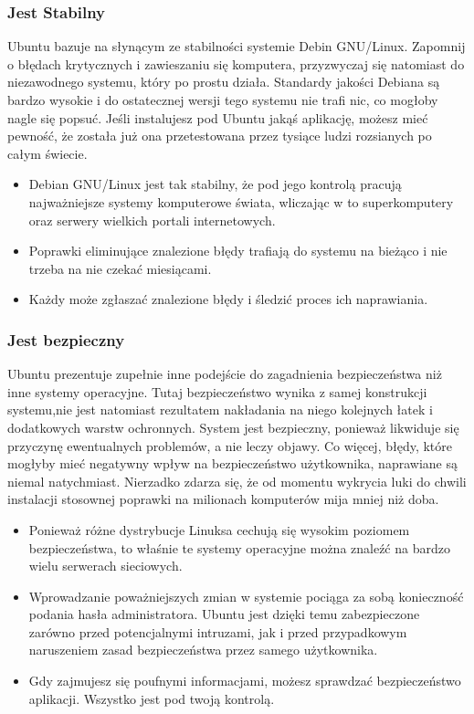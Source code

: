 \subsubsection{Jest Stabilny}
Ubuntu bazuje na słynącym ze stabilności systemie Debin GNU/Linux. Zapomnij o błędach krytycznych i zawieszaniu się komputera, przyzwyczaj się natomiast do niezawodnego systemu, który po prostu działa. Standardy jakości Debiana są bardzo wysokie i do ostatecznej wersji tego systemu nie trafi nic, co mogłoby nagle się popsuć. Jeśli instalujesz pod Ubuntu jakąś aplikację, możesz mieć pewność, że została już ona przetestowana przez tysiące ludzi rozsianych po całym świecie.
\begin{itemize}
\item Debian GNU/Linux jest tak stabilny, że pod jego kontrolą pracują najważniejsze systemy komputerowe świata, wliczając w to superkomputery oraz serwery wielkich portali internetowych.
\item Poprawki eliminujące znalezione błędy trafiają do systemu na bieżąco i nie trzeba na nie czekać miesiącami.
\item Każdy może zgłaszać znalezione błędy i śledzić proces ich naprawiania.
\end{itemize}

\subsubsection{Jest bezpieczny}
Ubuntu prezentuje zupełnie inne podejście do zagadnienia bezpieczeństwa niż inne systemy operacyjne. Tutaj bezpieczeństwo wynika z samej konstrukcji systemu,nie jest natomiast rezultatem nakładania na niego kolejnych łatek i dodatkowych warstw ochronnych. System jest bezpieczny, ponieważ likwiduje się przyczynę ewentualnych problemów, a nie leczy objawy. Co więcej, błędy, które mogłyby mieć negatywny wpływ na bezpieczeństwo użytkownika, naprawiane są niemal natychmiast. Nierzadko zdarza się, że od momentu wykrycia luki do chwili instalacji stosownej poprawki na milionach komputerów mija mniej niż doba.
\begin{itemize}
\item Ponieważ różne dystrybucje Linuksa cechują się wysokim poziomem bezpieczeństwa, to właśnie te systemy operacyjne można znaleźć na bardzo wielu serwerach sieciowych.
\item Wprowadzanie poważniejszych zmian w systemie pociąga za sobą konieczność podania hasła administratora. Ubuntu jest dzięki temu zabezpieczone zarówno przed potencjalnymi intruzami, jak i przed przypadkowym naruszeniem zasad bezpieczeństwa przez samego użytkownika.
\item Gdy zajmujesz się poufnymi informacjami, możesz sprawdzać bezpieczeństwo aplikacji. Wszystko jest pod twoją kontrolą.
\end{itemize}

